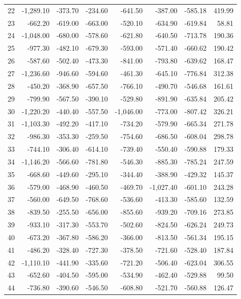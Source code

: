 \begin{longtable}{rrrrrrrr}
22 & -1,289.10 & -373.70 & -234.60 & -641.50 & -387.00 & -585.18 & 419.99  \\
23 & -662.20 & -619.00 & -663.00 & -520.10 & -634.90 & -619.84 & 58.81  \\
24 & -1,048.00 & -680.00 & -578.60 & -621.80 & -640.50 & -713.78 & 190.36  \\
25 & -977.30 & -482.10 & -679.30 & -593.00 & -571.40 & -660.62 & 190.42  \\
26 & -587.60 & -502.40 & -473.30 & -841.00 & -793.80 & -639.62 & 168.47  \\
27 & -1,236.60 & -946.60 & -594.60 & -461.30 & -645.10 & -776.84 & 312.38  \\
28 & -450.20 & -368.90 & -657.50 & -766.10 & -490.70 & -546.68 & 161.61  \\
29 & -799.90 & -567.50 & -390.10 & -529.80 & -891.90 & -635.84 & 205.42  \\
30 & -1,220.20 & -440.40 & -557.50 & -1,046.00 & -773.00 & -807.42 & 326.21  \\
31 & -1,103.30 & -492.20 & -417.10 & -734.20 & -579.90 & -665.34 & 271.78  \\
32 & -986.30 & -353.30 & -259.50 & -754.60 & -686.50 & -608.04 & 298.78  \\
33 & -744.10 & -306.40 & -614.10 & -739.40 & -550.40 & -590.88 & 179.33  \\
34 & -1,146.20 & -566.60 & -781.80 & -546.30 & -885.30 & -785.24 & 247.59  \\
35 & -668.60 & -449.60 & -295.10 & -344.40 & -388.90 & -429.32 & 145.37  \\
36 & -579.00 & -468.90 & -460.50 & -469.70 & -1,027.40 & -601.10 & 243.28  \\
37 & -560.00 & -649.50 & -768.60 & -536.60 & -413.30 & -585.60 & 132.59  \\
38 & -839.50 & -255.50 & -656.00 & -855.60 & -939.20 & -709.16 & 273.85  \\
39 & -933.10 & -317.30 & -553.70 & -502.60 & -824.50 & -626.24 & 249.73  \\
40 & -673.20 & -367.80 & -586.20 & -366.00 & -813.50 & -561.34 & 195.15  \\
41 & -486.20 & -328.40 & -727.30 & -378.50 & -721.60 & -528.40 & 187.84  \\
42 & -1,110.10 & -441.90 & -335.60 & -721.20 & -506.40 & -623.04 & 306.55  \\
43 & -652.60 & -404.50 & -595.00 & -534.90 & -462.40 & -529.88 & 99.50  \\
44 & -736.80 & -390.60 & -546.50 & -608.80 & -521.70 & -560.88 & 126.47  \\

\end{longtable}
